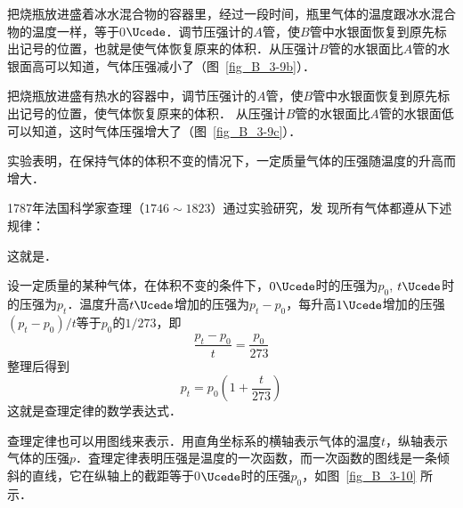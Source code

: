 把烧瓶放进盛着冰水混合物的容器里，经过一段时间，瓶里气体的温度跟冰水混合物的温度一样，等于0$\Ucede$．调节压强计的$A$管，使$B$管中水银面恢复到原先标出记号的位置，也就是使气体恢复原来的体积．从压强计$B$管的水银面比$A$管的水银面高可以知道，气体压强减小了（图~\ref{fig_B_3-9b}）．

把烧瓶放进盛有热水的容器中，调节压强计的$A$管，使$B$管中水银面恢复到原先标出记号的位置，使气体恢复原来的体积．
从压强计$B$管的水银面比$A$管的水银面低可以知道，这时气体压强增大了（图~\ref{fig_B_3-9c}）．

实验表明，在保持气体的体积不变的情况下，一定质量气体的压强随温度的升高而增大．

1787年法国科学家查理（$1746 \sim 1823$）通过实验研究，发
现所有气体都遵从下述规律：

这就是．

设一定质量的某种气体，在体积不变的条件下，$0 \Ucede $时的压强为$p_0$, $t \Ucede $时的压强为$p_t$．温度升高$t \Ucede $增加的压强为$p_t-p_0$，每升高$1 \Ucede$增加的压强$(p_t-p_0)/t$等于$p_0$的$1/273$，即
\[\frac{p_t-p_0}{t}=\frac{p_0}{273} \]
整理后得到
\[p_t=p_0 \left(1+\frac{t}{273}\right)\]
这就是查理定律的数学表达式．

查理定律也可以用图线来表示．用直角坐标系的横轴表示气体的温度$t$，纵轴表示气体的压强$p$．査理定律表明压强是温度的一次函数，而一次函数的图线是一条倾斜的直线，它在纵轴上的截距等于0$\Ucede$时的压强$p_0$，如图~\ref{fig_B_3-10} 所示．


